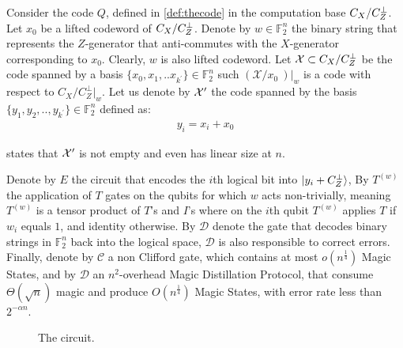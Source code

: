\begin{definition}
  \label{def:subcode}  
  Consider the code $Q$, defined in \cref{def:thecode} in the computation base $C_{X}/C_{Z}^\perp$. Let $x_{0}$ be a lifted codeword  of $C_{X}/C_{Z}^\perp$. Denote by $w \in \mathbb{F}_{2}^{n}$ the binary string that represents the $Z$-generator that anti-commutes with the $X$-generator corresponding to $x_{0}$. Clearly, $w$ is also lifted codeword. Let $\mathcal{X} \subset C_{X}/C_{Z}^\perp $ be the code spanned by a basis $ \{x_{0}, x_{1}, .. x_{k^\prime}\} \in \mathbb{F}_{2}^{n}$ such $\left( \mathcal{X}/x_0 \ \right)|_{w}$ is a \trig code with respect to $C_{X}/C_{Z}^{\perp}|_{w}$. Let us denote by $\mathcal{X}^\prime$ the code spanned by the basis $\{ y_{1}, y_{2}, .., y_{k^\prime} \} \in \mathbb{F}_{2}^{n}$ defined as: \begin{equation*}
    \begin{split}
 y_{i} = x_{i} + x_{0}
    \end{split}
  \end{equation*}
\end{definition}

  states that $\mathcal{X}^\prime$ is not empty and even has linear size at $n$.


 \begin{definition}
   \label{def:gates} 
   Denote by $E$ the circuit that encodes the $i$th logical bit into $\ket{y_{i}+C_{Z}^{\perp}}$, By $T^{(w)}$ the application of $T$ gates on the qubits for which $w$ acts non-trivially, meaning $T^{(w)}$ is a tensor product of $T$'s and $I$'s where on the $i$th qubit $T^{(w)}$ applies $T$ if $w_{i}$ equals $1$, and identity otherwise. By $\mathcal{D}$ denote the gate that decodes binary strings in $\mathbb{F}_{2}^{n}$ back into the logical space, $\mathcal{D}$ is also responsible to correct errors.
 Finally, denote by $\mathcal{C}$ a non Clifford gate, which contains at most $o(n^{\frac{1}{4}})$ Magic States, and by $\mathcal{D}$ an $n^{2}$-overhead  Magic Distillation Protocol, that consume $\Theta(\sqrt{n})$ magic and produce $O(n^\frac{1}{4})$ Magic States, with error rate less than $2^{-\alpha n}$.     
 \end{definition}

\begin{figure}
  \label{fig:circ}
  \noindent %
  \scalebox{1.7}{ 
  
}
\caption{ The circuit.   }
\end{figure}

